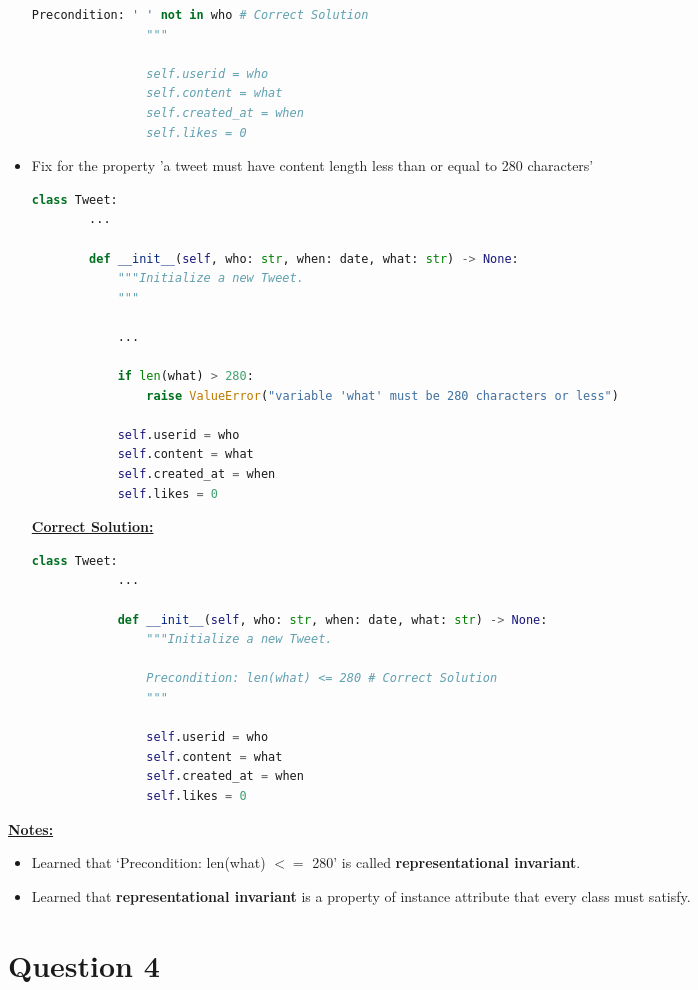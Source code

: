 \documentclass[12pt]{article}
\begin{document}
\begin{itemize}
\begin{mdframed}
\begin{lstlisting}[language=Python]
                Precondition: ' ' not in who # Correct Solution
                """

                self.userid = who
                self.content = what
                self.created_at = when
                self.likes = 0
        \end{lstlisting}
    \end{mdframed}


    \item Fix for the property 'a tweet must have content length less than or
    equal to 280 characters'

    \begin{lstlisting}[language=Python]
    class Tweet:
        ...

        def __init__(self, who: str, when: date, what: str) -> None:
            """Initialize a new Tweet.
            """

            ...

            if len(what) > 280:
                raise ValueError("variable 'what' must be 280 characters or less")

            self.userid = who
            self.content = what
            self.created_at = when
            self.likes = 0
    \end{lstlisting}

    \bigskip

    \begin{mdframed}
        \underline{\textbf{Correct Solution:}}

        \bigskip

        \begin{lstlisting}[language=Python]
        class Tweet:
            ...

            def __init__(self, who: str, when: date, what: str) -> None:
                """Initialize a new Tweet.

                Precondition: len(what) <= 280 # Correct Solution
                """

                self.userid = who
                self.content = what
                self.created_at = when
                self.likes = 0
        \end{lstlisting}
    \end{mdframed}

\end{itemize}

\bigskip

\underline{\textbf{Notes:}}

\begin{itemize}
    \item Learned that `Precondition: len(what) $<=$ 280' is called \textbf{representational invariant}.
    \item Learned that \textbf{representational invariant} is a property of instance attribute that
    every class must satisfy.
\end{itemize}

\bigskip

\section*{Question 4}
\end{document}
